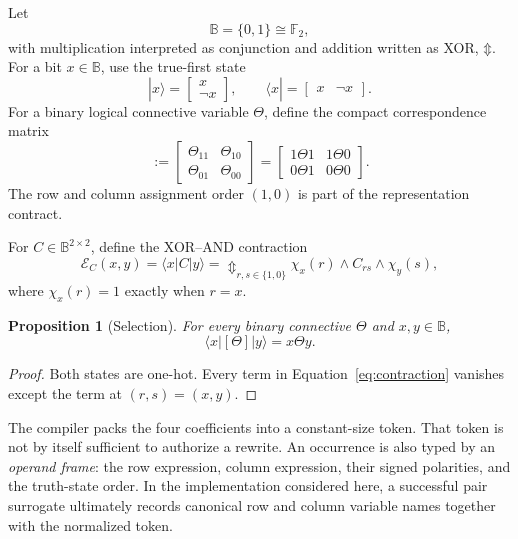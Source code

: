 \documentclass[10pt]{article}
\newcommand{\B}{\mathbb B}
\newcommand{\Ftwo}{\mathbb F_2}
\newcommand{\bxor}{\mathbin{\Updownarrow}}
\newcommand{\eval}{\mathcal E}
\theoremstyle{plain}
\newtheorem{proposition}{Proposition}
\theoremstyle{definition}
\theoremstyle{remark}
\begin{document}
Let
\begin{equation}
 \B=\{0,1\}\cong\Ftwo,
\end{equation}
with multiplication interpreted as conjunction and addition written as XOR, $\bxor$. For a bit $x\in\B$, use the true-first state
\begin{equation}
 |x\rangle=\begin{bmatrix}x\\ \neg x\end{bmatrix},
 \qquad
 \langle x|=\begin{bmatrix}x&\neg x\end{bmatrix}.
 \label{eq:state}
\end{equation}
For a binary logical connective variable $\Theta$, define the compact correspondence matrix
\begin{equation}
 [\Theta]
 :=
 \begin{bmatrix}
  \Theta_{11}&\Theta_{10}\\
  \Theta_{01}&\Theta_{00}
 \end{bmatrix}
 =
 \begin{bmatrix}
  1\Theta1&1\Theta0\\
  0\Theta1&0\Theta0
 \end{bmatrix}.
 \label{eq:cm}
\end{equation}
The row and column assignment order $(1,0)$ is part of the representation contract.

For $C\in\B^{2\times2}$, define the XOR--AND contraction
\begin{equation}
 \eval_C(x,y)=\langle x|C|y\rangle
 =\mathop{\bxor}_{r,s\in\{1,0\}}
 \chi_x(r)\wedge C_{rs}\wedge\chi_y(s),
 \label{eq:contraction}
\end{equation}
where $\chi_x(r)=1$ exactly when $r=x$.

\begin{proposition}[Selection]
For every binary connective $\Theta$ and $x,y\in\B$,
\begin{equation}
 \langle x|[\Theta]|y\rangle=x\Theta y.
 \label{eq:selection}
\end{equation}
\end{proposition}

\begin{proof}
Both states are one-hot. Every term in Equation~\eqref{eq:contraction} vanishes except the term at $(r,s)=(x,y)$.
\end{proof}

The compiler packs the four coefficients into a constant-size token. That token is not by itself sufficient to authorize a rewrite. An occurrence is also typed by an \emph{operand frame}: the row expression, column expression, their signed polarities, and the truth-state order. In the implementation considered here, a successful pair surrogate ultimately records canonical row and column variable names together with the normalized token.
\end{document}
